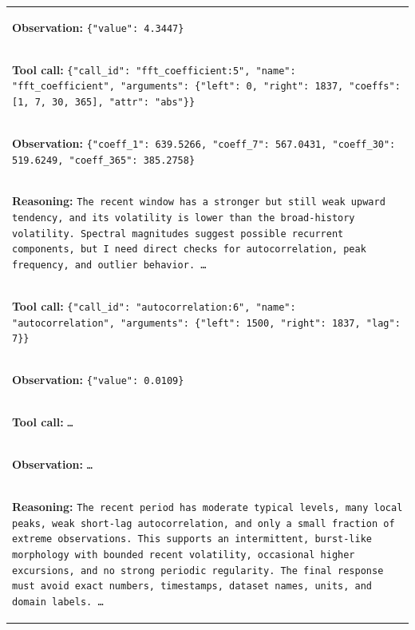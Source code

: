 \documentclass[11pt]{article}
\begin{document}
\begin{table}[t]
\begin{tabular}{p{}}
\colorbox{blue!10}{\parbox{0.95\textwidth}{%
\textbf{Observation:}
\texttt{\{"value": 4.3447\}}
}} \\

\hdashline

\colorbox{red!10}{\parbox{0.95\textwidth}{%
\textbf{Tool call:}
\texttt{\{"call\_id": "fft\_coefficient:5", "name": "fft\_coefficient",
"arguments": \{"left": 0, "right": 1837, "coeffs": [1, 7, 30, 365],
"attr": "abs"\}\}}
}} \\

\colorbox{blue!10}{\parbox{0.95\textwidth}{%
\textbf{Observation:}
\texttt{\{"coeff\_1": 639.5266, "coeff\_7": 567.0431, "coeff\_30":
519.6249, "coeff\_365": 385.2758\}}
}} \\

\hdashline

\colorbox{green!10}{\parbox{0.95\textwidth}{%
\textbf{Reasoning:}
\texttt{The recent window has a stronger but still weak upward tendency, and
its volatility is lower than the broad-history volatility. Spectral magnitudes
suggest possible recurrent components, but I need direct checks for
autocorrelation, peak frequency, and outlier behavior. \ldots}
}} \\

\hdashline

\colorbox{red!10}{\parbox{0.95\textwidth}{%
\textbf{Tool call:}
\texttt{\{"call\_id": "autocorrelation:6", "name": "autocorrelation",
"arguments": \{"left": 1500, "right": 1837, "lag": 7\}\}}
}} \\

\colorbox{blue!10}{\parbox{0.95\textwidth}{%
\textbf{Observation:}
\texttt{\{"value": 0.0109\}}
}} \\

\hdashline

\colorbox{red!10}{\parbox{0.95\textwidth}{%
\textbf{Tool call:}
\texttt{\ldots}
}} \\

\colorbox{blue!10}{\parbox{0.95\textwidth}{%
\textbf{Observation:}
\texttt{\ldots}
}} \\

\hdashline

\colorbox{green!10}{\parbox{0.95\textwidth}{%
\textbf{Reasoning:}
\texttt{The recent period has moderate typical levels, many local peaks, weak
short-lag autocorrelation, and only a small fraction of extreme observations.
This supports an intermittent, burst-like morphology with bounded recent
volatility, occasional higher excursions, and no strong periodic regularity.
The final response must avoid exact numbers, timestamps, dataset names, units,
and domain labels. \ldots}
}} \\


\end{tabular}
\end{table}
\end{document}
